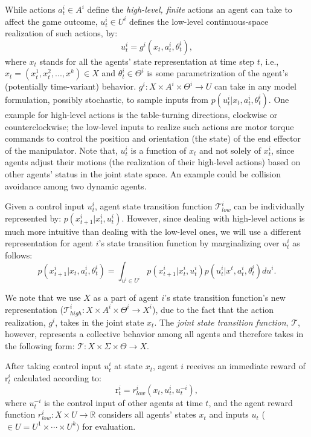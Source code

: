 \documentclass[letterpaper, 10 pt, conference]{ieeeconf}  %
\begin{document}
While actions $a_t^i \in A^i$ define the \textit{high-level, finite} actions an 
agent can take to affect the game outcome, $u_t^i \in U^i$ defines the low-level continuous-space
realization of such actions, by:
\begin{equation}\label{eq:g_function}
  u_t^i = g^i(x_t, a^i_t, \theta^i_t),
\end{equation}
where $x_t$ stands for all the agents' state representation at time step $t$, i.e., $x_t = (x^1_t, x^2_t,...,x^k)\in X$ and $\theta^i_t \in \Theta^i$ is some parametrization of the agent's (potentially time-variant) behavior.
$g^i:X \times A^i \times \Theta^i \rightarrow U$ can take in any model 
formulation, possibly stochastic, to sample inputs from $p(u_t^i|x_t,a^i_t,\theta_t^i)$. 
One example for high-level actions is the table-turning directions, clockwise 
or counterclockwise; the 
low-level inputs to realize such actions are motor torque commands to 
control the position and orientation (the state) of the end effector of the 
manipulator. Note that, $u_t^i$ is a 
function of $x_t$ and not solely of $x^i_t$, since agents adjust their 
motions (the realization of their high-level actions) based on other agents' 
status in the joint state space. An example could be collision avoidance 
among two dynamic agents.

Given a control input $u_t^i$, agent state transition function $\mathcal{T}^i_{low}$ 
can be individually represented by: $p(x^i_{t+1}|x^i_t,u^i_t)$. However, since dealing with high-level actions is much more intuitive than dealing with the low-level ones, we will use a different representation for agent $i$'s state transition function by marginalizing over $u^i_t$ as follows:
\begin{equation}
  p(x^i_{t+1}|x_t,a^i_t,\theta^i_t) = \int_{u^i \in U^i} 
  p(x_{t+1}^i|x^i_t,u^i_t) p(u^i_t|x^t,a^i_t,\theta^i_t)du^i.
\end{equation}

We note that we use $X$ as a part of agent $i$'s state transition function's new representation ($\mathcal{T}^i_{high}:X \times A^i \times \Theta^i \rightarrow X^i$), due to the fact that the action realization, $g^i$, takes in the joint state $x_t$. The \textit{joint state transition function}, $\mathcal{T}$, however, represents a collective behavior among all agents and therefore takes in the following form: 
$\mathcal{T}:X \times \Sigma \times \Theta \rightarrow X$. 

After taking control input $u_t^i$ at state $x_t$, agent $i$ receives an immediate reward of r$^i_t$ calculated according to: 
\begin{equation}\label{eq:r_control_input}
  \text{r}^i_t = r^i_{low}(x_t,u^i_t,u^{-i}_t),
\end{equation}
where $u^{-i}_t$ is the control input of other agents at time $t$, and the agent reward function $r^i_{low}: X \times U \rightarrow \mathbb{R}$ considers 
all agents' states $x_t$ and inputs $u_t$ ($\in U = U^1\times \cdots \times U^k)$ 
for evaluation. 
\end{document}
